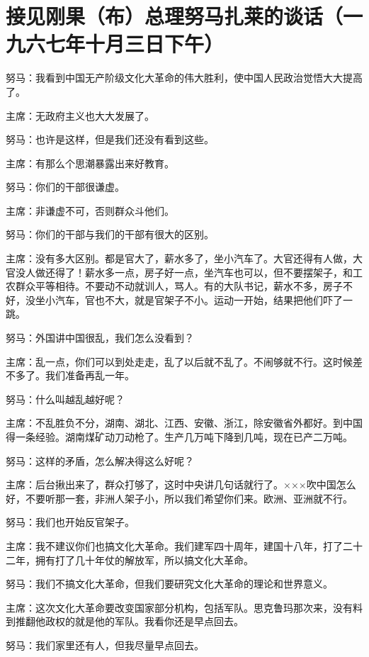 \section[接见刚果（布）总理努马扎莱的谈话（一九六七年十月三日下午）]{接见刚果（布）总理努马扎莱的谈话（一九六七年十月三日下午）}


努马：我看到中国无产阶级文化大革命的伟大胜利，使中国人民政治觉悟大大提高了。

主席：无政府主义也大大发展了。

努马：也许是这样，但是我们还没有看到这些。

主席：有那么个思潮暴露出来好教育。

努马：你们的干部很谦虚。

主席：非谦虚不可，否则群众斗他们。

努马：你们的干部与我们的干部有很大的区别。

主席：没有多大区别。都是官大了，薪水多了，坐小汽车了。大官还得有人做，大官没人做还得了！薪水多一点，房子好一点，坐汽车也可以，但不要摆架子，和工农群众平等相待。不要动不动就训人，骂人。有的大队书记，薪水不多，房子不好，没坐小汽车，官也不大，就是官架子不小。运动一开始，结果把他们吓了一跳。

努马：外国讲中国很乱，我们怎么没看到？

主席：乱一点，你们可以到处走走，乱了以后就不乱了。不闹够就不行。这时候差不多了。我们准备再乱一年。

努马：什么叫越乱越好呢？

主席：不乱胜负不分，湖南、湖北、江西、安徽、浙江，除安徽省外都好。到中国得一条经验。湖南煤矿动刀动枪了。生产几万吨下降到几吨，现在已产二万吨。

努马：这样的矛盾，怎么解决得这么好呢？

主席：后台揪出来了，群众打够了，这时中央讲几句话就行了。×××吹中国怎么好，不要听那一套，非洲人架子小，所以我们希望你们来。欧洲、亚洲就不行。

努马：我们也开始反官架子。

主席：我不建议你们也搞文化大革命。我们建军四十周年，建国十八年，打了二十二年，拥有打了几十年仗的解放军，所以搞文化大革命。

努马：我们不搞文化大革命，但我们要研究文化大革命的理论和世界意义。

主席：这次文化大革命要改变国家部分机构，包括军队。思克鲁玛那次来，没有料到推翻他政权的就是他的军队。我看你还是早点回去。

努马：我们家里还有人，但我尽量早点回去。

